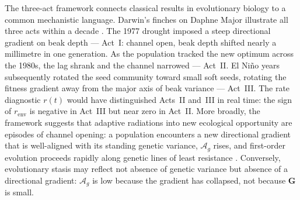 \documentclass[9pt,twocolumn,twoside]{pnas-new}
\newcommand{\mat}[1]{\mathbf{#1}}
\newcommand{\Ag}{\mathcal{A}_{g}}
\begin{document}
The three-act framework connects classical results in evolutionary
biology to a common mechanistic language.
Darwin's finches on Daphne Major illustrate all three acts within
a decade \cite{GrantGrant2002,GrantGrant2014}.
The 1977 drought imposed a steep directional gradient on beak
depth --- Act~I: channel open, beak depth shifted nearly a
millimetre in one generation.
As the population tracked the new optimum across the 1980s, the
lag shrank and the channel narrowed --- Act~II.
El Niño years subsequently rotated the seed community toward small
soft seeds, rotating the fitness gradient away from the major axis
of beak variance --- Act~III.
The rate diagnostic $r(t)$ would have distinguished Acts~II and~III
in real time: the sign of $r_{\mathrm{env}}$ is negative in Act~III
but near zero in Act~II.
More broadly, the framework suggests that adaptive radiations into
new ecological opportunity \cite{Schluter2000} are episodes of
channel opening: a population encounters a new directional gradient
that is well-aligned with its standing genetic variance, $\Ag$
rises, and first-order evolution proceeds rapidly along genetic
lines of least resistance \cite{Schluter1996}.
Conversely, evolutionary stasis may reflect not absence of genetic
variance but absence of a directional gradient: $\Ag$ is low
because the gradient has collapsed, not because $\mat{G}$ is small.
\end{document}
